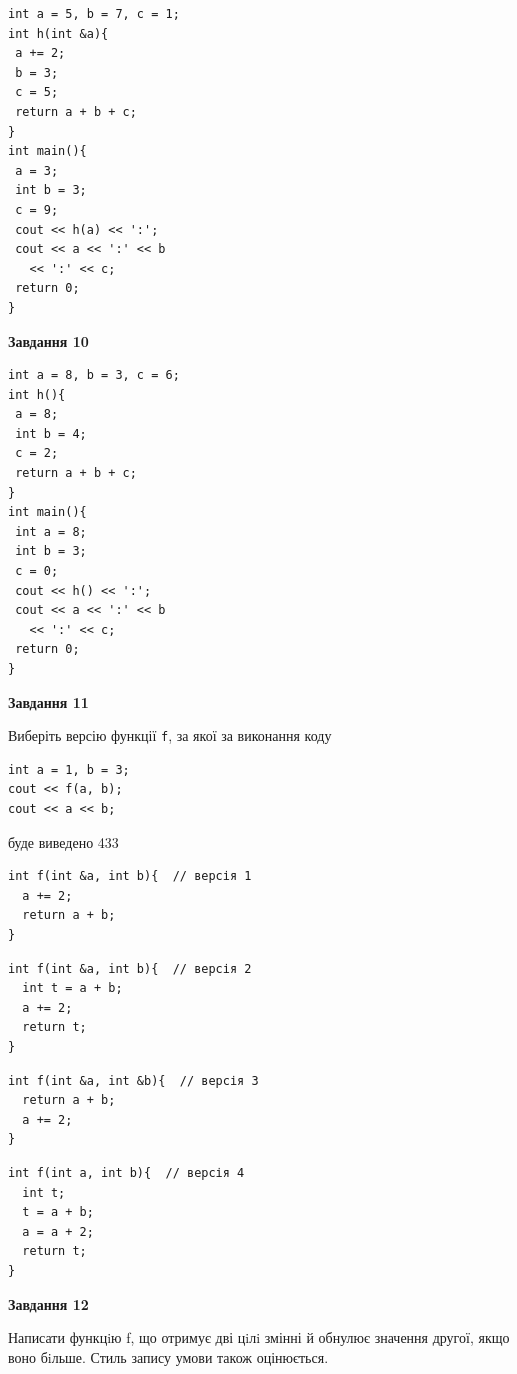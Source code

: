 \documentclass[12pt, ukrainian]{article}
\def\code#1{\Verb!#1!}
\begin{document}
{\begin {large}
\begin{minipage}[t]{7.0cm}
\begin{verbatim}
int a = 5, b = 7, c = 1;
int h(int &a){
 a += 2;
 b = 3;
 c = 5;
 return a + b + c;
}
int main(){
 a = 3;
 int b = 3;
 c = 9;
 cout << h(a) << ':';
 cout << a << ':' << b 
   << ':' << c;
 return 0;
}
\end{verbatim}



\begin{center}
\textbf{Завдання 10}
\end{center}
\vspace{-8mm}

\begin{verbatim}
int a = 8, b = 3, c = 6;
int h(){
 a = 8;
 int b = 4;
 c = 2;
 return a + b + c;
}
int main(){
 int a = 8;
 int b = 3;
 c = 0;
 cout << h() << ':';
 cout << a << ':' << b 
   << ':' << c;
 return 0;
}
\end{verbatim}

\end{minipage}
\vline \hspace{1mm}
\begin{minipage}[t]{11.0cm}

\begin{center}
\textbf{Завдання 11}
\end{center}
Виберіть версію функції \code{f}, за якої за виконання коду
\begin{verbatim}
int a = 1, b = 3;
cout << f(a, b);
cout << a << b;
\end{verbatim}

буде виведено 433

\begin{verbatim}
int f(int &a, int b){  // версія 1
  a += 2;
  return a + b;
}
\end{verbatim}

\vspace{-8mm}\begin{verbatim}
int f(int &a, int b){  // версія 2
  int t = a + b;
  a += 2;
  return t;
}
\end{verbatim}

\vspace{-8mm}\begin{verbatim}
int f(int &a, int &b){  // версія 3
  return a + b;
  a += 2;
}
\end{verbatim}

\vspace{-8mm}\begin{verbatim}
int f(int a, int b){  // версія 4
  int t;
  t = a + b;
  a = a + 2;
  return t;
}
\end{verbatim}



\begin{center}
\textbf{Завдання 12}
\end{center}

Написати функцiю f, що отримує дві цiлi змінні й обнулює значення другої, якщо воно бiльше. Стиль запису умови також оцінюється.\par

\end{minipage}

\end {large}}
\newpage
\end{document}
